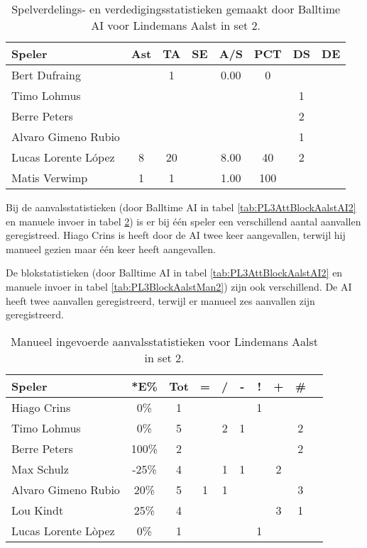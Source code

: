 \begin{table}[ht!]
  \centering
  \scriptsize
  \begin{tabular}{|l|c|c|c|c|c|c|c|} \hline
    \textbf{Speler} & Ast & TA & SE & A/S & PCT & DS & DE \\ \hline
    Bert Dufraing &  & 1 &  & 0.00 & 0 &  &  \\
    Timo Lohmus &   &   &   &   &   & 1  &   \\
    Berre Peters &   &   &   &   &   &  2 &   \\
    Alvaro Gimeno Rubio &  &  &  &  &   & 1 &   \\
    Lucas Lorente López & 8 & 20 &  & 8.00 & 40 & 2 &  \\
    Matis Verwimp & 1 & 1 &  & 1.00 & 100 &   &   \\ \hline
  \end{tabular}
  \caption[Spelverdelings- en verdedigingsstatistieken gemaakt door Balltime AI voor Lindemans Aalst in set 2]{\label{tab:PL3SetDigAalstAI2}Spelverdelings- en verdedigingsstatistieken gemaakt door Balltime AI voor Lindemans Aalst in set 2.}
\end{table}

Bij de aanvalsstatistieken (door Balltime AI in tabel \ref{tab:PL3AttBlockAalstAI2} en manuele invoer in tabel \ref{tab:PL3AttAalstMan2}) is er bij één speler een verschillend aantal aanvallen geregistreed. Hiago Crins is heeft door de AI twee keer aangevallen, terwijl hij manueel gezien maar één keer heeft aangevallen.

De blokstatistieken (door Balltime AI in tabel \ref{tab:PL3AttBlockAalstAI2} en manuele invoer in tabel \ref{tab:PL3BlockAalstMan2}) zijn ook verschillend. De AI heeft twee aanvallen geregistreerd, terwijl er manueel zes aanvallen zijn geregistreerd. 

\begin{table}[ht!]
    \centering
    \scriptsize
    \begin{tabular}{|l|c|c|c|c|c|c|c|c|c|}
        \hline
        \textbf{Speler} & *E\% & Tot & = & / & - & ! & + & \# \\ \hline
        Hiago Crins & 0\% & 1 &  &  &  & 1 &  & \\ 
        Timo Lohmus & 0\% & 5 &  & 2 & 1 &  & & 2 \\ 
        Berre Peters & 100\% & 2 &  &  & & & & 2 \\ 
        Max Schulz & -25\% & 4 &  & 1 & 1 &  & 2 & \\ 
        Alvaro Gimeno Rubio & 20\% & 5 & 1 & 1 &  &  &  & 3 \\ 
        Lou Kindt & 25\% & 4 &  &  &  &  & 3 & 1 \\
        Lucas Lorente Lòpez & 0\% & 1 &  &  &  & 1 &  & \\ \hline
    \end{tabular}
    \caption[Manueel ingevoerde aanvalsstatistieken voor Lindemans Aalst in set 2]{\label{tab:PL3AttAalstMan2}Manueel ingevoerde aanvalsstatistieken voor Lindemans Aalst in set 2.}
\end{table}

